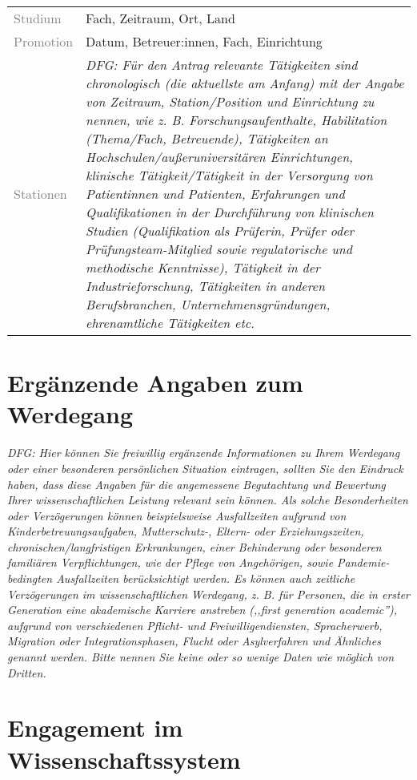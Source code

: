 \documentclass[a4paper,11pt]{article}
\begin{document}
\noindent
\begin{tabularx}{\textwidth}{@{}lX}
\textcolor{gray}{Studium} & Fach, Zeitraum, Ort, Land \\
\textcolor{gray}{Promotion} & Datum, Betreuer:innen, Fach, Einrichtung\\
\textcolor{gray}{Stationen} & \emph{DFG: Für den Antrag relevante Tätigkeiten sind chronologisch (die aktuellste am Anfang) mit der Angabe von Zeitraum, Station/Position und Einrichtung zu nennen, wie z. B. Forschungsaufenthalte, Habilitation (Thema/Fach, Betreuende), Tätigkeiten an Hochschulen/außeruniversitären Einrichtungen, klinische Tätigkeit/Tätigkeit in der Versorgung von Patientinnen und Patienten, Erfahrungen und Qualifikationen in der Durchführung von klinischen Studien (Qualifikation als Prüferin, Prüfer oder Prüfungsteam-Mitglied sowie regulatorische und methodische Kenntnisse), Tätigkeit in der Industrieforschung, Tätigkeiten in anderen Berufsbranchen, Unternehmensgründungen, ehrenamtliche Tätigkeiten etc.}
\end{tabularx}

\section*{Ergänzende Angaben zum Werdegang}

\emph{DFG: Hier können Sie freiwillig ergänzende Informationen zu
Ihrem Werdegang oder einer besonderen persönlichen Situation
eintragen, sollten Sie den Eindruck haben, dass diese Angaben für
die angemessene Begutachtung und Bewertung Ihrer wissenschaftlichen
Leistung relevant sein können. Als solche Besonderheiten oder
Verzögerungen können beispielsweise Ausfallzeiten aufgrund von
Kinderbetreuungsaufgaben, Mutterschutz-, Eltern- oder
Erziehungszeiten, chronischen/langfristigen Erkrankungen, einer
Behinderung oder besonderen familiären Verpflichtungen, wie der
Pflege von Angehörigen, sowie Pandemie-bedingten Ausfallzeiten
berücksichtigt werden. Es können auch zeitliche Verzögerungen im
wissenschaftlichen Werdegang, z. B. für Personen, die in erster
Generation eine akademische Karriere anstreben (,,first generation
academic''), aufgrund von verschiedenen Pflicht- und
Freiwilligendiensten, Spracherwerb, Migration oder
Integrationsphasen, Flucht oder Asylverfahren und Ähnliches genannt
werden. Bitte nennen Sie keine oder so wenige Daten wie möglich von
Dritten. }

\section*{Engagement im Wissenschaftssystem}
\end{document}
